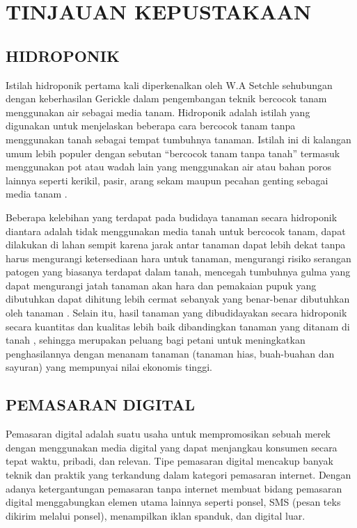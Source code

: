 \fancyhf{} 
\fancyfoot[C]{\thepage}
\chapter{TINJAUAN KEPUSTAKAAN}               

\section{\uppercase{Hidroponik}}
Istilah hidroponik pertama kali diperkenalkan oleh W.A Setchle sehubungan dengan keberhasilan Gerickle dalam pengembangan teknik bercocok tanam menggunakan air sebagai media tanam. Hidroponik adalah istilah yang digunakan untuk menjelaskan beberapa cara bercocok tanam tanpa menggunakan tanah sebagai tempat tumbuhnya tanaman. Istilah ini di kalangan umum lebih populer dengan sebutan “bercocok tanam tanpa tanah” termasuk menggunakan pot atau wadah lain yang menggunakan air atau bahan poros lainnya seperti kerikil, pasir, arang sekam maupun pecahan genting sebagai media tanam \citep{lingga1992}.

\par Beberapa kelebihan yang terdapat pada budidaya tanaman secara hidroponik diantara adalah tidak menggunakan media tanah untuk bercocok tanam, dapat dilakukan di lahan sempit karena jarak antar tanaman dapat lebih dekat tanpa harus mengurangi ketersediaan hara untuk tanaman, mengurangi risiko serangan patogen yang biasanya terdapat dalam tanah, mencegah tumbuhnya gulma yang dapat mengurangi jatah tanaman akan hara dan pemakaian pupuk yang dibutuhkan dapat dihitung lebih cermat sebanyak yang benar-benar dibutuhkan oleh tanaman \citep{soeseno1991, anonim1992}. Selain itu, hasil tanaman yang dibudidayakan secara hidroponik secara kuantitas dan kualitas lebih baik dibandingkan tanaman yang ditanam di tanah \citep{resh1995hydroponic}, sehingga merupakan peluang bagi petani untuk meningkatkan penghasilannya dengan menanam tanaman (tanaman hias, buah-buahan dan sayuran) yang mempunyai nilai ekonomis tinggi.

\section{\uppercase{Pemasaran Digital}}
Pemasaran digital adalah suatu usaha untuk mempromosikan sebuah merek dengan menggunakan media digital yang dapat menjangkau konsumen secara tepat waktu, pribadi, dan relevan. Tipe pemasaran digital mencakup banyak teknik dan praktik yang terkandung dalam kategori pemasaran internet. Dengan adanya ketergantungan pemasaran tanpa internet membuat bidang pemasaran digital menggabungkan elemen utama lainnya seperti ponsel, SMS (pesan teks dikirim melalui ponsel), menampilkan iklan spanduk, dan digital luar. \citep{wikipedia2021}

